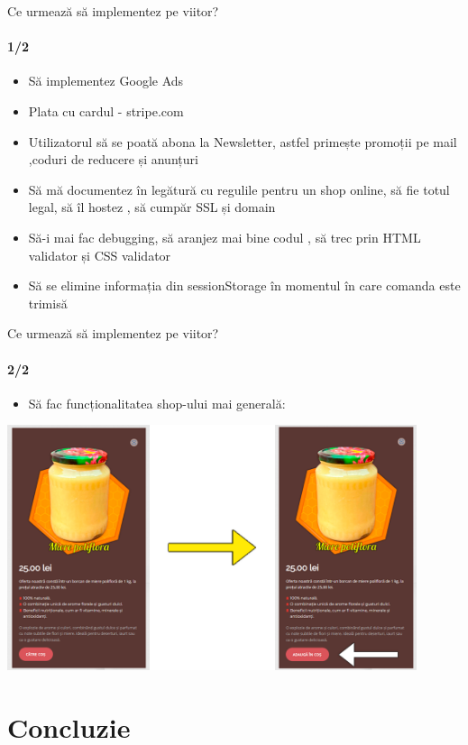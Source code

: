 \documentclass{beamer}
\begin{document}
\begin{darkframes}
		\begin{frame}{Ce urmează să implementez pe viitor?}
			\framesubtitle{1/2}
			\begin{itemize}
				\item Să implementez Google Ads
				\item Plata cu cardul - stripe.com
				\item Utilizatorul să se poată abona la Newsletter, astfel primește promoții pe mail ,coduri de reducere și anunțuri
				\item Să mă documentez în legătură cu regulile pentru un shop online, să fie totul legal, să îl hostez , să cumpăr SSL și domain 
				\item Să-i mai fac debugging, să aranjez mai bine codul , să trec prin HTML validator și CSS validator
				\item Să se elimine informația din sessionStorage în momentul în care comanda este trimisă 
			\end{itemize}
		\end{frame}
		
		\begin{frame}{Ce urmează să implementez pe viitor?}
			\framesubtitle{2/2}
			\begin{itemize}
				\item Să fac funcționalitatea shop-ului mai generală:
			\end{itemize}
			\vspace{1em}
			\begin{center}
				\includegraphics[width=0.9\textwidth]{PRODUSSSSSS.png}
			\end{center}
		\end{frame}
		
		
		\section{Concluzie}
		

\end{darkframes}
\end{document}
